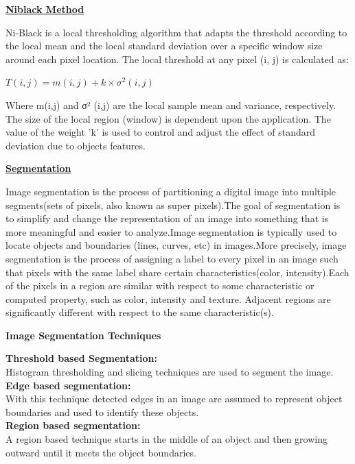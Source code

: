 \documentclass[10pt,a4paper]{article}
\begin{document}
\begin{center}
\underline{\textbf{Niblack Method}}
\end{center}
Ni-Black is a local thresholding algorithm that adapts the threshold according to the local mean and the local standard deviation over a specific window size around each pixel location. The local threshold at any pixel (i, j) is calculated as:\\
\begin{center}
$T(i,j) = m(i,j) + k \times \sigma^{2}(i,j)$\\
\end{center}Where m(i,j) and σ² (i,j) are the local sample mean and variance, respectively. The size of the local region (window) is dependent upon the application. The value of the weight 'k' is used to control and adjust the effect of standard deviation due to objects features.\\
\begin{center}
\underline{\textbf{Segmentation}}
\end{center}
Image segmentation is the process of partitioning a digital image into multiple segments(sets of pixels, also known as super pixels).The goal of segmentation is to simplify and change the representation of an image into something that is more meaningful
and easier to analyze.Image segmentation is typically used to locate objects and boundaries (lines, curves, etc) in images.More precisely, image segmentation is the process of assigning
a label to every pixel in an image such that pixels with the same label share certain characteristics(color, intensity).Each of the pixels in a region are similar with respect to some characteristic or computed property, such as color, intensity and texture. Adjacent regions are significantly different with respect to the same characteristic(s). \\
\begin{center}
\textbf{Image Segmentation Techniques}
\end{center}
\textbf{Threshold based Segmentation:}\\Histogram thresholding and slicing techniques are used to segment the image.\\
\textbf{Edge based segmentation:} \\With this technique detected edges in an image are assumed to represent object boundaries and used to identify these objects.\\
\textbf{Region based segmentation:}\\ A region based technique starts in the middle of an object and then growing outward until it meets the object boundaries.\\
\end{document}
